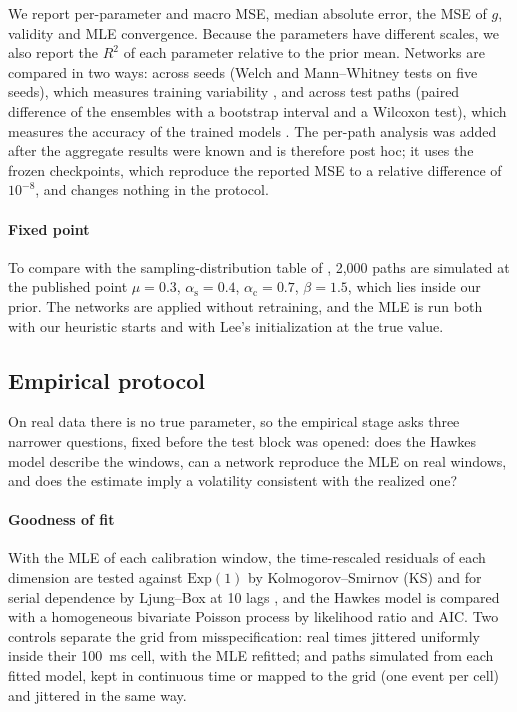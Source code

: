 \documentclass[preprint,12pt,authoryear]{elsarticle}
\newcommand{\aself}{\alpha_{\mathrm{s}}}
\newcommand{\across}{\alpha_{\mathrm{c}}}
\begin{document}
We report per-parameter and macro MSE, median absolute error, the MSE of $g$, validity and
MLE convergence. Because the parameters have different scales, we also report the $R^2$ of
each parameter relative to the prior mean. Networks are compared in two ways: across seeds
(Welch and Mann--Whitney tests on five seeds), which measures training variability
\citep{bouthillier2021}, and across test paths (paired difference of the ensembles with a
bootstrap interval and a Wilcoxon test), which measures the accuracy of the trained models
\citep{efron1993,diebold1995}. The per-path analysis was added after the aggregate results
were known and is therefore post hoc; it uses the frozen checkpoints, which reproduce the
reported MSE to a relative difference of $10^{-8}$, and changes nothing in the protocol.

\paragraph{Fixed point} To compare with the sampling-distribution table of \citet{lee2023},
2,000 paths are simulated at the published point $\mu=0.3$, $\aself=0.4$, $\across=0.7$,
$\beta=1.5$, which lies inside our prior. The networks are applied without retraining, and the MLE
is run both with our heuristic starts and with Lee's initialization at the true value.

\subsection{Empirical protocol}

On real data there is no true parameter, so the empirical stage asks three narrower
questions, fixed before the test block was opened: does the Hawkes model describe the
windows, can a network reproduce the MLE on real windows, and does the estimate imply a
volatility consistent with the realized one?

\paragraph{Goodness of fit} With the MLE of each calibration window, the time-rescaled
residuals of each dimension are tested against $\mathrm{Exp}(1)$ by Kolmogorov--Smirnov (KS)
and for serial dependence by Ljung--Box at 10 lags \citep{ogata1988,brown2002}, and the Hawkes
model is compared with a homogeneous bivariate Poisson process by likelihood ratio and AIC.
Two controls separate the grid from misspecification: real times jittered uniformly inside
their 100~ms cell, with the MLE refitted; and paths simulated from each fitted model, kept in
continuous time or mapped to the grid (one event per cell) and jittered in the same way.
\end{document}
